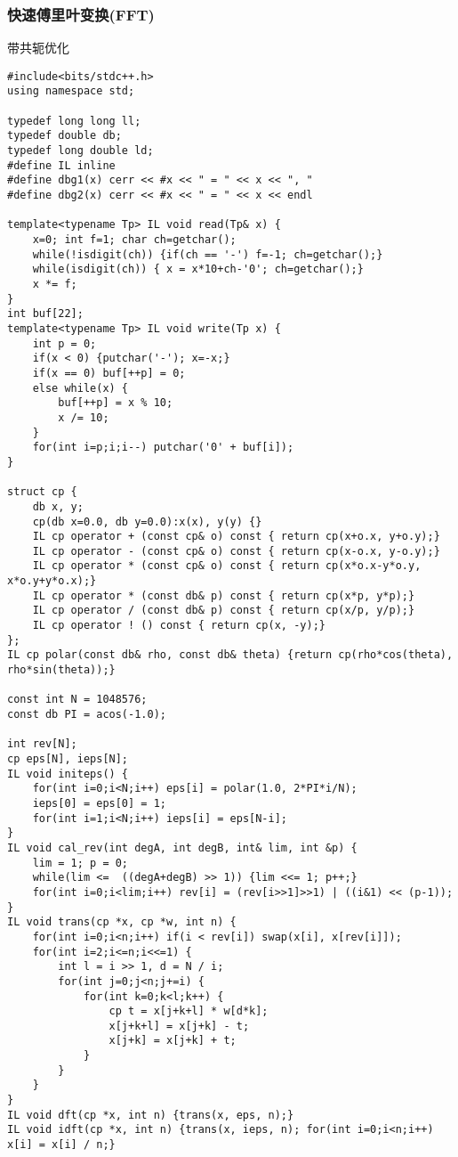 \documentclass[UTF8]{ctexart}
\begin{document}
\subsubsection{快速傅里叶变换(FFT)}
带共轭优化
\begin{framed}
\begin{lstlisting}
#include<bits/stdc++.h>
using namespace std;

typedef long long ll;
typedef double db;
typedef long double ld;
#define IL inline
#define dbg1(x) cerr << #x << " = " << x << ", "
#define dbg2(x) cerr << #x << " = " << x << endl

template<typename Tp> IL void read(Tp& x) {
    x=0; int f=1; char ch=getchar();
    while(!isdigit(ch)) {if(ch == '-') f=-1; ch=getchar();}
    while(isdigit(ch)) { x = x*10+ch-'0'; ch=getchar();}
    x *= f;
}
int buf[22];
template<typename Tp> IL void write(Tp x) {
    int p = 0;
    if(x < 0) {putchar('-'); x=-x;}
    if(x == 0) buf[++p] = 0;
    else while(x) {
        buf[++p] = x % 10;
        x /= 10;
    }
    for(int i=p;i;i--) putchar('0' + buf[i]);
}

struct cp {
    db x, y;
    cp(db x=0.0, db y=0.0):x(x), y(y) {}
    IL cp operator + (const cp& o) const { return cp(x+o.x, y+o.y);}
    IL cp operator - (const cp& o) const { return cp(x-o.x, y-o.y);}
    IL cp operator * (const cp& o) const { return cp(x*o.x-y*o.y, x*o.y+y*o.x);}
    IL cp operator * (const db& p) const { return cp(x*p, y*p);}
    IL cp operator / (const db& p) const { return cp(x/p, y/p);}
    IL cp operator ! () const { return cp(x, -y);}
};
IL cp polar(const db& rho, const db& theta) {return cp(rho*cos(theta), rho*sin(theta));}

const int N = 1048576;
const db PI = acos(-1.0);

int rev[N];
cp eps[N], ieps[N];
IL void initeps() {
    for(int i=0;i<N;i++) eps[i] = polar(1.0, 2*PI*i/N);
    ieps[0] = eps[0] = 1;
    for(int i=1;i<N;i++) ieps[i] = eps[N-i];
}
IL void cal_rev(int degA, int degB, int& lim, int &p) {
    lim = 1; p = 0;
    while(lim <=  ((degA+degB) >> 1)) {lim <<= 1; p++;}
    for(int i=0;i<lim;i++) rev[i] = (rev[i>>1]>>1) | ((i&1) << (p-1));
}
IL void trans(cp *x, cp *w, int n) {
    for(int i=0;i<n;i++) if(i < rev[i]) swap(x[i], x[rev[i]]);
    for(int i=2;i<=n;i<<=1) {
        int l = i >> 1, d = N / i;
        for(int j=0;j<n;j+=i) {
            for(int k=0;k<l;k++) {
                cp t = x[j+k+l] * w[d*k];
                x[j+k+l] = x[j+k] - t;
                x[j+k] = x[j+k] + t;
            }
        }
    }
}
IL void dft(cp *x, int n) {trans(x, eps, n);}
IL void idft(cp *x, int n) {trans(x, ieps, n); for(int i=0;i<n;i++) x[i] = x[i] / n;}


\end{lstlisting}
\end{framed}
\end{document}
